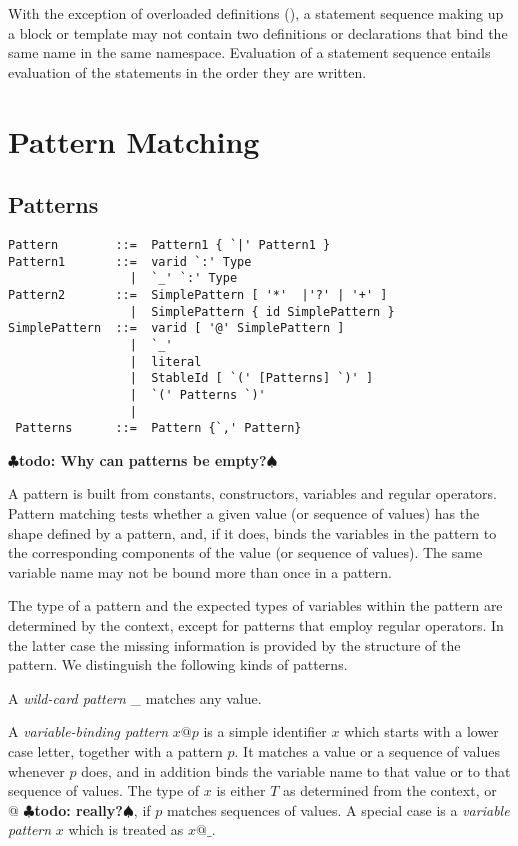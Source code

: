 \documentclass[a4paper,12pt,twoside,titlepage]{book}
\renewcommand{\todo}[1]{{$\clubsuit$\bf todo: #1$\spadesuit$}}
\begin{document}
With the exception of overloaded definitions
(), a statement sequence making up a block
or template may not contain two definitions or declarations that bind
the same name in the same namespace.  Evaluation of a statement
sequence entails evaluation of the statements in the order they are
written.

\chapter{Pattern Matching}

\section{Patterns}


\label{sec:patterns}

\syntax\begin{lstlisting}
Pattern        ::=  Pattern1 { `|' Pattern1 }
Pattern1       ::=  varid `:' Type
                 |  `_' `:' Type
Pattern2       ::=  SimplePattern [ '*'  |'?' | '+' ]
                 |  SimplePattern { id SimplePattern }
SimplePattern  ::=  varid [ '@' SimplePattern ]
                 |  `_'
                 |  literal
                 |  StableId [ `(' [Patterns] `)' ]
                 |  `(' Patterns `)'
                 |   
 Patterns      ::=  Pattern {`,' Pattern}
\end{lstlisting}

\todo{Why can patterns be empty?}

A pattern is built from constants, constructors, variables and regular
operators. Pattern matching tests whether a given value (or sequence
of values) has the shape defined by a pattern, and, if it does, binds
the variables in the pattern to the corresponding components of the
value (or sequence of values).  The same variable name may not be
bound more than once in a pattern.

The type of a pattern and the expected types of variables within the
pattern are determined by the context, except for patterns
that employ regular operators. In the latter case  the missing 
information is provided by the structure of the pattern. 
We distinguish the following kinds of patterns.

A {\em wild-card pattern} \_ matches any value. 

A {\em variable-binding pattern} $x @ p$ is a simple identifier $x$
which starts with a lower case letter, together with a pattern $p$. It
matches a value or a sequence of values whenever $p$ does, and in
addition binds the variable name to that value or to that sequence of
values. The type of $x$ is either $T$ as determined from the context, or
\lstinline@List[$T\,$]@ \todo{really?}, if $p$ matches sequences of values. A
special case is a {\em variable pattern} $x$ which is treated as $x @ \_$. 
\end{document}
